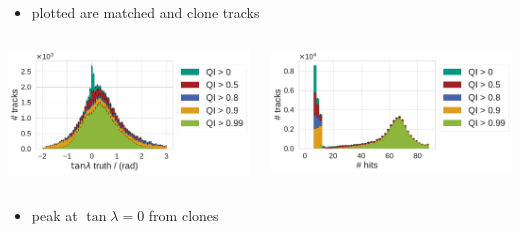 \documentclass[18pt, aspectratio=169]{beamer}
\begin{document}
\begin{frame}
\begin{columns}
\begin{column}{.5\textwidth}
    \end{column}
  \end{columns}
  \begin{itemize}
  \item plotted are matched and clone tracks
  \end{itemize}
\end{frame}

\begin{frame}
  \begin{columns}
    \begin{column}{.5\textwidth}
      \centering
      \includegraphics[width=.9\textwidth]{figures/combined-qi/tan_lambda_distributions_by_qi.pdf}      
    \end{column}
    \begin{column}{.5\textwidth}
      \centering
      \includegraphics[width=.9\textwidth]{figures/combined-qi/nhits_distributions_by_qi.pdf}      
    \end{column}
  \end{columns}
  \begin{itemize}
  \item peak at $\tan{\lambda} = 0$ from clones
  \end{itemize}
\end{frame}
\end{document}
